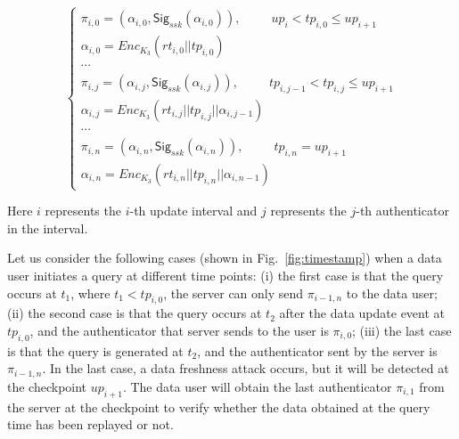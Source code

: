 \begin{equation}
    \left\{
    \begin{array}{ll} %
      \pi_{i, 0} = (\alpha_{i, 0}, \mathsf{Sig}_{ssk}(\alpha_{i, 0})),~~~~~~~~~~~up_i < tp_{i, 0} \leq up_{i+1} \\
      \alpha_{i, 0} = Enc_{K_3}(rt_{i, 0}||tp_{i, 0}) \\
      \cdots \\

     \pi_{i, j} = (\alpha_{i, j}, \mathsf{Sig}_{ssk}(\alpha_{i, j})),~~~~~~~~~~~tp_{i, j-1} < tp_{i, j} \leq up_{i+1}  \\
     \alpha_{i, j} = Enc_{K_3}(rt_{i, j}||tp_{i, j}||\alpha_{i, j-1}) \\
      \cdots  \\
     \pi_{i, n} = (\alpha_{i, n}, \mathsf{Sig}_{ssk}(\alpha_{i, n})),~~~~~~~~~~~tp_{i, n}=up_{i+1} \\
     \alpha_{i, n} = Enc_{K_3}(rt_{i, n}||tp_{i, n}||\alpha_{i, n-1})
    \end{array}
    \right.
  \end{equation}

\noindent Here $i$ represents the $i$-th update interval and $j$ represents the $j$-th authenticator in the interval.

Let us consider the following cases (shown in Fig.~\ref{fig:timestamp}) when a data user initiates a query at different time points: (i) the first case is that the query occurs at $t_1$, where $t_1 < tp_{i, 0}$, the server can only send $\pi_{i-1, n}$ to the data user; (ii) the second case is that the query occurs at $t_2$ after the data update event at $tp_{i, 0}$, and the authenticator that server sends to the user is $\pi_{i, 0}$; (iii) the last case is that the query is generated at $t_2$, and the authenticator sent by the server is $\pi_{i-1, n}$. In the last case, a data freshness attack occurs, but it will be detected at the checkpoint $up_{i+1}$. The data user will obtain the last authenticator $\pi_{i, 1}$ from the server at the checkpoint to verify whether the data obtained at the query time has been replayed or not.

